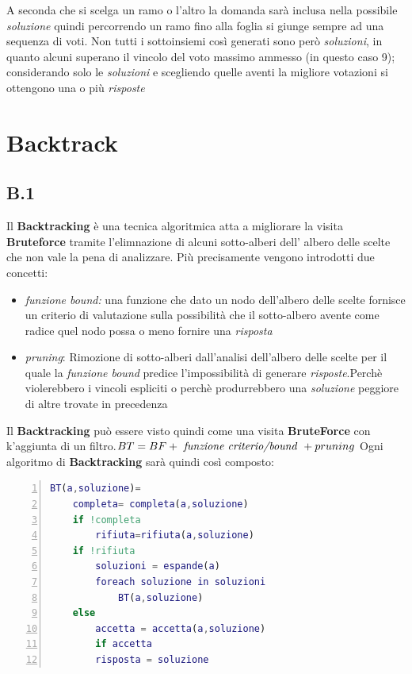 \documentclass[a4paper]{article}
\begin{document}
\begin{itemize}
\begin{center}
		\end{center}
		A seconda che si scelga un ramo o l'altro la domanda sarà inclusa nella possibile \emph{soluzione} quindi percorrendo un ramo fino alla foglia si giunge sempre ad una sequenza di voti.
		Non tutti i sottoinsiemi così generati sono però \emph{soluzioni}, in quanto alcuni superano il vincolo del voto massimo ammesso (in questo caso 9); considerando solo le \emph{soluzioni} e scegliendo quelle aventi la migliore votazioni si ottengono una o più \emph{risposte}
\end{itemize}
\section{Backtrack}
\subsection{B.1}
Il \textbf{Backtracking} è una tecnica algoritmica atta a migliorare la visita \textbf{Bruteforce} tramite l'elimnazione di alcuni sotto-alberi dell' albero delle scelte che non vale la pena di analizzare.
Più precisamente vengono introdotti due concetti:
\begin{itemize}
	\item \textit{funzione bound:} una funzione che dato un nodo dell'albero delle scelte fornisce un criterio di valutazione sulla possibilità che il sotto-albero avente come radice quel nodo possa o meno fornire una \textit{risposta}
	\item \textit{pruning}: Rimozione di sotto-alberi dall'analisi dell'albero delle scelte per il quale la \textit{funzione bound} predice l'impossibilità di generare \textit{risposte}.Perchè violerebbero i vincoli espliciti o perchè produrrebbero una \textit{soluzione} peggiore di altre trovate in precedenza
\end{itemize}
Il \textbf{Backtracking} può essere visto quindi come una visita \textbf{BruteForce} con k'aggiunta di un filtro.$BT = BF + \text{ \textit{funzione criterio/bound} }+ pruning$
Ogni algoritmo di \textbf{Backtracking} sarà quindi così composto:
\begin{lstlisting}[numbers=left,firstnumber=1,stepnumber=1, xleftmargin=15pt, language=Matlab ]
BT(a,soluzione)=
    completa= completa(a,soluzione)
    if !completa
        rifiuta=rifiuta(a,soluzione)
	if !rifiuta
	    soluzioni = espande(a)
	    foreach soluzione in soluzioni
	        BT(a,soluzione)
    else
    	accetta = accetta(a,soluzione)
        if accetta
	    risposta = soluzione
\end{lstlisting}
\end{document}

